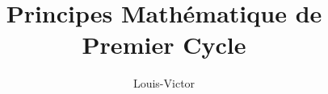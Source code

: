 \documentclass{book}
\title{Principes Mathématique de Premier Cycle}
\author{Louis-Victor}
\theoremstyle{plain}
\theoremstyle{definition}
\begin{document}
\maketitle
\date{}
\tableofcontents
\newpage
\end{document}
